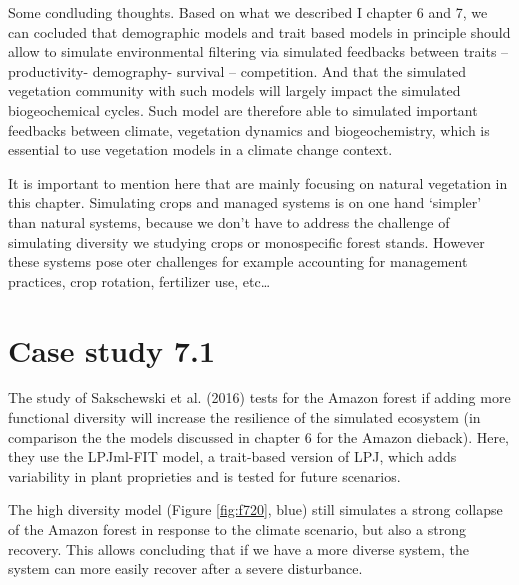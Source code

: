 \documentclass[12pt,oneside]{book}
\begin{document}
Some condluding thoughts. Based on what we described I chapter 6 and 7,
we can cocluded that demographic models and trait based models in
principle should allow to simulate environmental filtering via simulated
feedbacks between traits -- productivity- demography- survival --
competition. And that the simulated vegetation community with such
models will largely impact the simulated biogeochemical cycles. Such
model are therefore able to simulated important feedbacks between
climate, vegetation dynamics and biogeochemistry, which is essential to
use vegetation models in a climate change context.

It is important to mention here that are mainly focusing on natural
vegetation in this chapter. Simulating crops and managed systems is on
one hand `simpler' than natural systems, because we don't have to
address the challenge of simulating diversity we studying crops or
monospecific forest stands. However these systems pose oter challenges
for example accounting for management practices, crop rotation,
fertilizer use, etc\ldots{}

\section{Case study 7.1}\label{case-study-7.1}

The study of Sakschewski et al. (2016) tests for the Amazon forest if
adding more functional diversity will increase the resilience of the
simulated ecosystem (in comparison the the models discussed in chapter 6
for the Amazon dieback). Here, they use the LPJml-FIT model, a
trait-based version of LPJ, which adds variability in plant proprieties
and is tested for future scenarios.

The high diversity model (Figure \ref{fig:f720}, blue) still simulates a
strong collapse of the Amazon forest in response to the climate
scenario, but also a strong recovery. This allows concluding that if we
have a more diverse system, the system can more easily recover after a
severe disturbance.
\end{document}
